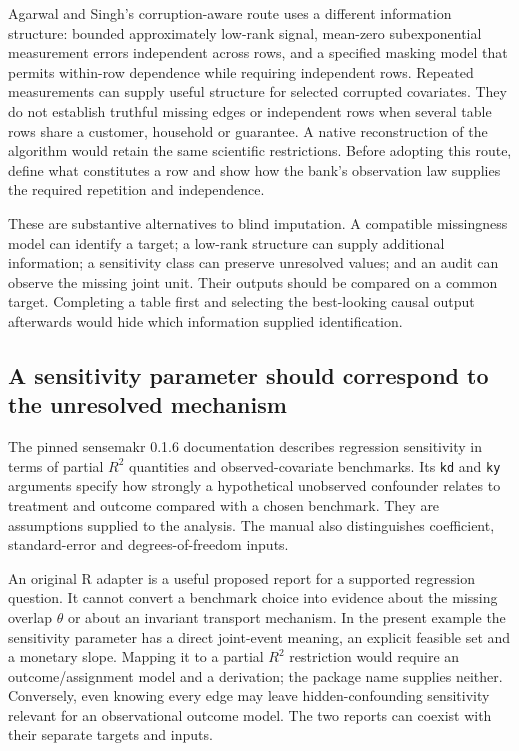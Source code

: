 Agarwal and Singh's corruption-aware route uses a different information
structure: bounded approximately low-rank signal, mean-zero subexponential
measurement errors independent across rows, and a specified masking model
that permits within-row dependence while requiring independent rows.
\citep[Section 5.1, Assumptions 5.1--5.3]{corrupt2022} Repeated measurements
can supply useful structure for selected corrupted covariates. They do not
establish truthful missing edges or independent rows when several table rows
share a customer, household or guarantee. A native reconstruction of the
algorithm would retain the same scientific restrictions. Before adopting
this route, define what constitutes a row and show how the bank's observation
law supplies the required repetition and independence.

These are substantive alternatives to blind imputation. A compatible
missingness model can identify a target; a low-rank structure can supply
additional information; a sensitivity class can preserve unresolved values;
and an audit can observe the missing joint unit. Their outputs should be
compared on a common target. Completing a table first and selecting the
best-looking causal output afterwards would hide which information supplied
identification.

\subsection{A sensitivity parameter should correspond to the unresolved mechanism}

The pinned sensemakr 0.1.6 documentation describes regression sensitivity in
terms of partial $R^2$ quantities and observed-covariate benchmarks. Its
\texttt{kd} and \texttt{ky} arguments specify how strongly a hypothetical
unobserved confounder relates to treatment and outcome compared with a chosen
benchmark. They are assumptions supplied to the analysis. The manual also
distinguishes coefficient, standard-error and degrees-of-freedom inputs.
\citep{v12_sw_sensemakr}

An original R adapter is a useful proposed report for a supported regression
question. It cannot convert a benchmark choice into evidence about the
missing overlap $\theta$ or about an invariant transport mechanism. In the
present example the sensitivity parameter has a direct joint-event meaning,
an explicit feasible set and a monetary slope. Mapping it to a partial
$R^2$ restriction would require an outcome/assignment model and a derivation;
the package name supplies neither. Conversely, even knowing every edge may
leave hidden-confounding sensitivity relevant for an observational outcome
model. The two reports can coexist with their separate targets and inputs.

